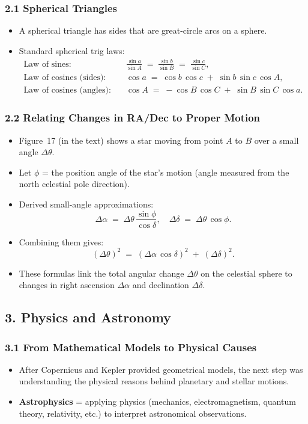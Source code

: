 \subsubsection{2.1 Spherical Triangles}
\begin{itemize}
  \item A spherical triangle has sides that are great-circle arcs on a sphere.
  \item Standard spherical trig laws:
  \begin{align*}
    \text{Law of sines:}& \quad \frac{\sin a}{\sin A} \;=\;\frac{\sin b}{\sin B} \;=\;\frac{\sin c}{\sin C}, \\
    \text{Law of cosines (sides):}& \quad \cos a \;=\;\cos b\,\cos c \;+\;\sin b\,\sin c\,\cos A, \\
    \text{Law of cosines (angles):}& \quad \cos A \;=\;-\cos B\,\cos C \;+\;\sin B\,\sin C\,\cos a.
  \end{align*}
\end{itemize}

\subsubsection{2.2 Relating Changes in RA/Dec to Proper Motion}
\begin{itemize}
  \item Figure~17 (in the text) shows a star moving from point $A$ to $B$ over a small angle $\Delta \theta$.
  \item Let $\phi$ = the position angle of the star’s motion (angle measured from the north celestial pole direction).
  \item Derived small-angle approximations:
  \[
    \Delta \alpha \;=\; \Delta \theta\,\frac{\sin \phi}{\cos \delta}, 
    \quad
    \Delta \delta \;=\; \Delta \theta\,\cos \phi.
  \]
  \item Combining them gives:
  \[
    (\Delta \theta)^2 \;=\; (\Delta \alpha \,\cos\delta)^2 \;+\; (\Delta \delta)^2.
  \]
  \item These formulas link the total angular change $\Delta \theta$ on the celestial sphere to changes in right ascension $\Delta \alpha$ and declination $\Delta \delta$.
\end{itemize}

\subsection{3. Physics and Astronomy}

\subsubsection{3.1 From Mathematical Models to Physical Causes}
\begin{itemize}
  \item After Copernicus and Kepler provided geometrical models, the next step was understanding the physical reasons behind planetary and stellar motions.
  \item \textbf{Astrophysics} = applying physics (mechanics, electromagnetism, quantum theory, relativity, etc.) to interpret astronomical observations.
\end{itemize}

